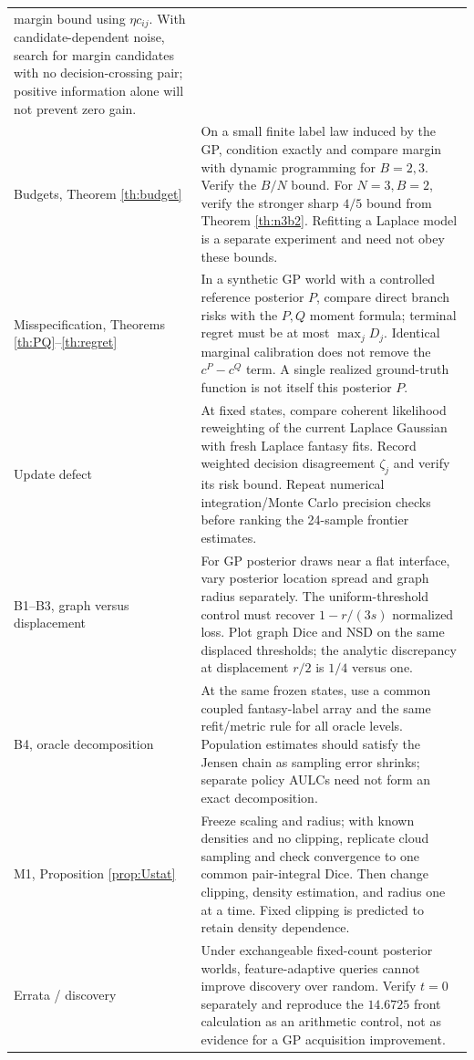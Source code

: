 \documentclass[11pt]{article}
\theoremstyle{definition}
\newcommand{\1}{\mathbf 1}
\begin{document}
\begin{longtable}{p{}p{}}
margin bound using $\eta c_{ij}$. With candidate-dependent noise, search
for margin candidates with no decision-crossing pair; positive information
alone will not prevent zero gain.\\
Budgets, Theorem \ref{th:budget}&
On a small finite label law induced by the GP, condition exactly and compare
margin with dynamic programming for $B=2,3$. Verify the $B/N$ bound.
For $N=3,B=2$, verify the stronger sharp $4/5$ bound from
Theorem \ref{th:n3b2}. Refitting a Laplace model is a separate experiment
and need not obey these bounds.\\
Misspecification, Theorems \ref{th:PQ}--\ref{th:regret}&
In a synthetic GP world with a controlled reference posterior $P$, compare
direct branch risks with the $P,Q$ moment formula; terminal regret must
be at most $\max_jD_j$. Identical marginal calibration does not remove the
$c^P-c^Q$ term. A single realized ground-truth function is not itself this
posterior $P$.\\
Update defect&
At fixed states, compare coherent likelihood reweighting of the current
Laplace Gaussian with fresh Laplace fantasy fits. Record weighted
decision disagreement $\zeta_j$ and verify its risk bound.
Repeat numerical integration/Monte Carlo precision checks before ranking
the 24-sample frontier estimates.\\
B1--B3, graph versus displacement&
For GP posterior draws near a flat interface, vary posterior location spread
and graph radius separately. The uniform-threshold control must recover
$1-r/(3s)$ normalized loss. Plot graph Dice and NSD on the same displaced
thresholds; the analytic discrepancy at displacement $r/2$ is $1/4$ versus one.\\
B4, oracle decomposition&
At the same frozen states, use a common coupled fantasy-label array and
the same refit/metric rule for all oracle levels. Population estimates
should satisfy the Jensen chain as sampling error shrinks; separate
policy AULCs need not form an exact decomposition.\\
M1, Proposition \ref{prop:Ustat}&
Freeze scaling and radius; with known densities and no clipping, replicate
cloud sampling and check convergence to one common pair-integral Dice.
Then change clipping, density estimation, and radius one at a time.
Fixed clipping is predicted to retain density dependence.\\
Errata / discovery&
Under exchangeable fixed-count posterior worlds, feature-adaptive queries
cannot improve discovery over random. Verify $t=0$ separately and reproduce
the $14.6725$ front calculation as an arithmetic control, not as evidence
for a GP acquisition improvement.\\
\bottomrule
\end{longtable}
\normalsize
\end{document}
